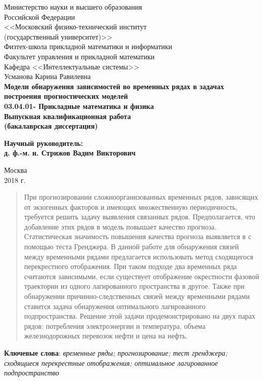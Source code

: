 \documentclass[14pt]{article}
\renewcommand{\baselinestretch}{1.5}
\begin{document}

{
\renewcommand{\baselinestretch}{1}
\thispagestyle{empty}
\begin{center}
    \sc
        Министерство науки и высшего образования \\ 
        Российской Федерации\\
        <<Московский физико-технический институт \\
        {(государственный университет)}>>\\
		Физтех-школа прикладной математики и информатики \\        
        Факультет управления и прикладной математики\\
        Кафедра <<Интеллектуальные системы>>\\[35mm]
    \rm\large
        Усманова Карина Равилевна\\[10mm]
    \bf\Large
        Модели обнаружения зависимостей во временных рядах в задачах построения прогностических моделей\\[10mm]
    \rm\normalsize
        03.04.01- Прикладные математика и физика\\[10mm]
    \sc
        Выпускная квалификационная работа\\
        (бакалаврская диссертация)\\[30mm]
\end{center}
\hfill\parbox{80mm}{
    \begin{flushleft}
    \bf
        Научный руководитель:\\
    \rm
    	д. ф.-м. н. Стрижов Вадим Викторович\\[5cm]
    \end{flushleft}
}
\begin{center}
    Москва\\
    2018 г.
\end{center}
}

\newpage
\begin{abstract}
При прогнозировании сложноорганизованных временных рядов, зависящих от экзогенных факторов и имеющих множественную периодичность, требуется решить задачу выявления связанных рядов. 
Предполагается, что добавление этих рядов в модель повышает качество прогноза. 
Статистическая значимость повышения качества прогноза выявляется в с помощью теста Гренджера. 
В данной работе для обнаружения связей между временными рядами предлагается использовать метод сходящегося перекрестного отображения. 
При таком подходе два временных ряда считаются зависимыми, если существует отображение окрестности фазовой траектории из одного лагированного пространства в другое.  
Также при обнаружении причинно-следственных связей между временными рядами ставится задача обнаружения оптимального лагированного подпространства. 
Решение этой задачи продемонстрировано на двух парах рядов: потребления электроэнергии и температура,  объема железнодорожных перевозок нефти и цена на нефть.
\end{abstract}
\textbf{Ключевые слова}: \textit{временные ряды; прогнозирование; тест гренджера; сходящиеся перекрестные отображения; оптимальное лагированное подпространство}
\end{document}
